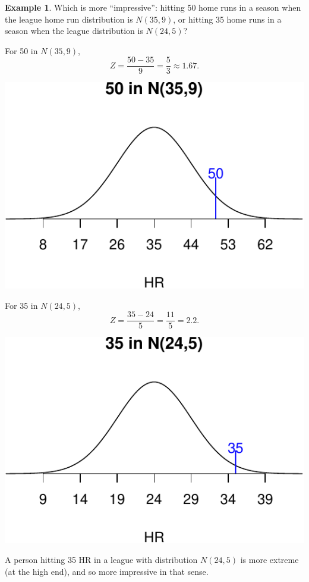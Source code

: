 \documentclass[
]{book}
\theoremstyle{definition}
\theoremstyle{definition}
\newtheorem{example}{Example}[chapter]
\theoremstyle{definition}
\theoremstyle{definition}
\theoremstyle{remark}
\begin{document}
\begin{example}
\protect\hypertarget{exm:comparing-values-with-z-scores}{}\label{exm:comparing-values-with-z-scores}Which is more ``impressive'': hitting 50 home runs in a season when the league home run distribution is \(N(35,9)\), or hitting 35 home runs in a season when the league distribution is \(N(24,5)\)?

For 50 in \(N(35,9)\), \[Z = \frac{50-35}{9} = \frac{5}{3} \approx 1.67.\]

\includegraphics{math340-notes_files/figure-latex/unnamed-chunk-19-1.pdf}

For 35 in \(N(24,5)\), \[Z = \frac{35-24}{5} = \frac{11}{5} = 2.2.\]

\includegraphics{math340-notes_files/figure-latex/unnamed-chunk-20-1.pdf}

A person hitting 35 HR in a league with distribution \(N(24,5)\) is more extreme (at the high end), and so more impressive in that sense.
\end{example}
\end{document}
